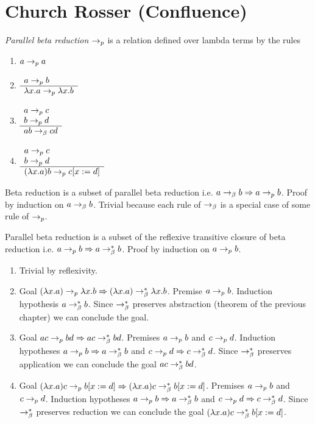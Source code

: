 \section{Church Rosser (Confluence)}

\begin{definition}
  \emph{Parallel beta reduction} $\to_{p}$ is a relation
  defined over lambda terms by the rules
  \begin{enumerate}
  \item $a \to_{p} a$
  \item $\begin{array}{l} a \to_{p} b \\ \hline \lambda x.a \to_{p} \lambda x.b\end{array}$
  \item $\begin{array}{l} a\to_{p} c \\ b \to_{p} d \\ \hline a b \to_\beta c d\end{array}$
  \item $\begin{array}{l} a\to_{p} c \\ b \to_{p} d \\ \hline (\lambda x.a) b \to_{p} c[x := d]\end{array}$
  \end{enumerate}
\end{definition}

\begin{lemma}
  Beta reduction is a subset of parallel beta reduction i.e.
  $a \to_\beta b \Rightarrow a \to_{p} b$.
  Proof by induction on $a \to_\beta b$. Trivial because each rule of $\to_\beta$
  is a special case of some rule of $\to_{p}$.
\end{lemma}


\begin{lemma}
  Parallel beta reduction is a subset of the reflexive transitive closure of
  beta reduction i.e.
  $a \to_{p} b \Rightarrow a \to^*_\beta b$.
  Proof by induction on $a \to_{p} b$.
  \begin{enumerate}
  \item
    Trivial by reflexivity.
  \item
    Goal $
    (\lambda x.a) \to_{p} \lambda x.b  \Rightarrow
    (\lambda x.a) \to^*_\beta \lambda x.b$.
    Premise $a \to_{p} b$.
    Induction hypothesis $a \to^*_\beta b$.
    Since $\to^*_\beta$ preserves abstraction (theorem of the previous
    chapter) we can conclude the goal.
  \item
    Goal $a c \to_{p} b d \Rightarrow a c \to^*_\beta b d$.
    Premises $a \to_{p} b$ and $c \to_{p} d$.
    Induction hypotheses $a \to_{p} b \Rightarrow a \to^*_\beta b$ and
    $c \to_{p} d \Rightarrow c \to^*_\beta d$.
    Since $\to^*_\beta$ preserves application we can conclude the goal $a c
    \to^*_\beta b d$.
  \item
    Goal $(\lambda x.a) c \to_{p} b[x:=d] \Rightarrow
    (\lambda x.a) c \to^*_\beta b[x:=d]$.
    Premises $a \to_{p} b$ and $c \to_{p} d$.
    Induction hypotheses $a \to_{p} b \Rightarrow a \to^*_\beta b$ and
    $c \to_{p} d \Rightarrow c \to^*_\beta d$.
    Since $\to^*_\beta$ preserves reduction we can conclude the goal $(\lambda x.a) c
    \to^*_\beta b[x:=d]$.
  \end{enumerate}
\end{lemma}



